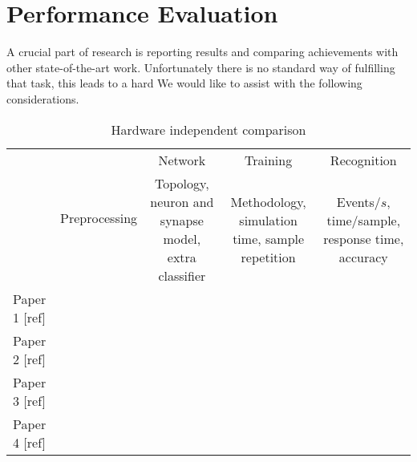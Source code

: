 \section{Performance Evaluation}
\label{sec:eval}

A crucial part of research is reporting results and comparing achievements with other state-of-the-art work. Unfortunately there is no standard way of fulfilling that task, this leads to a hard 
We would like to assist with the following considerations.
\begin{table*}[hbt!]
  \caption{Hardware independent comparison}
  \begin{center}
    \bgroup
    \def\arraystretch{1.4}
    \begin{tabular}{ l | c c c c }
      $ $ &
      \multirow{2}{*}{\begin{minipage}{1.9cm}Preprocessing\end{minipage} }& 
      \begin{minipage}{2.5cm}\centering Network\end{minipage} & 
      \begin{minipage}{2.5cm}\centering Training \end{minipage} & 
      \begin{minipage}{2.5cm}\centering Recognition \end{minipage} \\
      \cline{3-5}
       & 
       & 
      \begin{minipage}{2.5cm}\centering \vspace*{0.1cm} Topology, neuron and synapse model, extra classifier \end{minipage} &
      \begin{minipage}{2.5cm}\centering \vspace*{0.1cm} Methodology, simulation time, sample repetition \end{minipage} & 
      \begin{minipage}{2.5cm}\centering \vspace*{0.1cm} Events/$s$, time/sample, response time, accuracy\end{minipage} \\
      \hline
      \begin{minipage}{2cm} Paper 1 [ref] \end{minipage} & & & &  \\
      \begin{minipage}{2cm} Paper 2 [ref]\end{minipage}  & & & &  \\
      \begin{minipage}{2cm} Paper 3 [ref]\end{minipage}  & & & &  \\
      \begin{minipage}{2cm} Paper 4 [ref]\end{minipage}  & & & &  
    \end{tabular}
    \egroup
  \end{center}
  \label{tb:software_comparison}
\end{table*}

